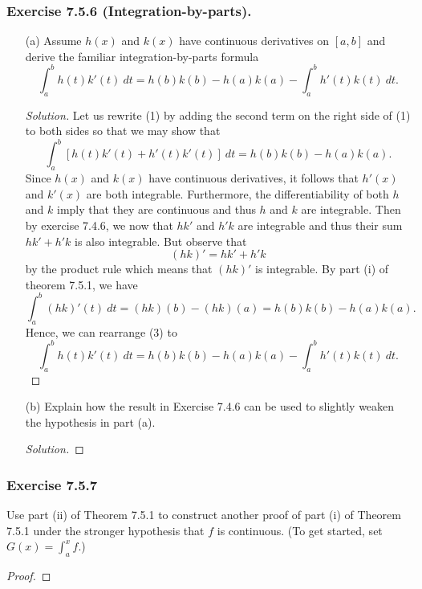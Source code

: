 \subsubsection{Exercise 7.5.6 (Integration-by-parts).} 
\begin{enumerate}
	\item[(a)] Assume \( h(x)  \) and \( k(x)  \) have continuous derivatives on \( [a,b]  \) and derive the familiar integration-by-parts formula 
		\[  \int_{ a }^{ b } h(t)k'(t) \   dt = h(b)k(b) - h(a)k(a) - \int_{ a }^{ b } h'(t)k(t) \    dt. \tag{1} \]
		\begin{proof}[Solution]
		Let us rewrite (1) by adding the second term on the right side of (1) to both sides so that we may show that 
		\[  \int_{ a }^{ b } [h(t)k'(t) + h'(t)k'(t)] \    dt = h(b)k(b) - h(a)k(a) \tag{2}. \]
	Since \( h(x)  \) and \( k(x)  \) have continuous derivatives, it follows that \( h'(x)  \) and \( k'(x)  \) are both integrable. Furthermore, the differentiability of both \( h  \) and \( k  \) imply that they are continuous and thus \( h \) and \( k  \) are integrable. Then by exercise 7.4.6, we now that \( h k'  \) and \( h'k  \) are integrable and thus their sum \( hk' + h'k  \) is also integrable. But observe that 
	\[  (hk)' = hk' + h'k  \]
	by the product rule which means that \( (hk)' \) is integrable. By part (i) of theorem 7.5.1, we have 
	\[  \int_{ a }^{ b } (hk)'(t) \ dt = (hk)(b) - (hk)(a) = h(b)k(b) - h(a)k(a) \tag{3}. \]
	Hence, we can rearrange (3) to 
	\[  \int_{ a }^{ b } h(t)k'(t) \   dt = h(b)k(b) - h(a)k(a) - \int_{ a }^{ b } h'(t)k(t) \    dt. \]
		\end{proof}
	\item[(b)] Explain how the result in Exercise 7.4.6 can be used to slightly weaken the hypothesis in part (a).
		\begin{proof}[Solution]
		
		\end{proof}
\end{enumerate}
 
\subsubsection{Exercise 7.5.7} Use part (ii) of Theorem 7.5.1 to construct another proof of part (i) of Theorem 7.5.1 under the stronger hypothesis that \( f  \) is continuous. (To get started, set \( G(x) = \int_{ a }^{ x }  f   \).)
\begin{proof}
\end{proof}



